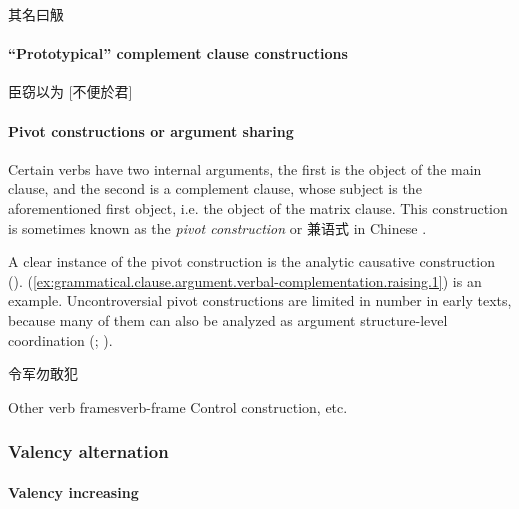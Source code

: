 \documentclass[UTF8, a4paper, oneside, scheme=plain, 12pt]{ctexrep}
\newcommand*{\citepage}[1]{p.~{#1}}
\newcommand*{\term}[1]{\emph{#1}}
\begin{document}
\begin{exe}
    \ex\label{ex:grammatical.clause.argument.verbal-complementation.direct-quotation.nominal-say.1} 其名曰觙
\end{exe}

\paragraph{``Prototypical'' complement clause constructions}

\begin{exe}
    \ex 臣窃以为 [不便於君]
\end{exe}

\paragraph{Pivot constructions or argument sharing}

Certain verbs have two internal arguments,
the first is the object of the main clause,
and the second is a complement clause, whose subject is the aforementioned first object,
i.e. the object of the matrix clause.
This construction is sometimes known as the \term{pivot construction} \citep[\citepage{40}]{pulleyblank1995outline} or 兼语式 in Chinese \citep[\citepage{375}]{meiguang2018}.

A clear instance of the pivot construction is the analytic causative construction ().
(\ref{ex:grammatical.clause.argument.verbal-complementation.raising.1}) is an example.
Uncontroversial pivot constructions are limited in number in early texts,
because many of them can also be analyzed as argument structure-level coordination
(\citealt[\citepage{376}]{meiguang2018}; ).

\begin{exe}
    \ex\label{ex:grammatical.clause.argument.verbal-complementation.raising.1} 令军勿敢犯
\end{exe}

\begin{todobox}{Other verb frames}{verb-frame}
    Control construction, etc.
\end{todobox}

\subsubsection{Valency alternation}

\paragraph{Valency increasing}\label{sec:grammatical.clause.argument.alternation.increase}
\end{document}

